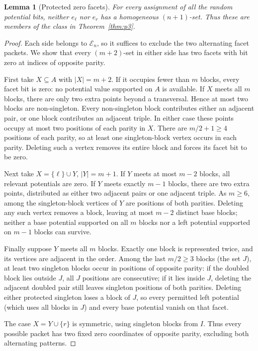 \documentclass[11pt,a4paper]{article}
\newtheorem{lemma}[theorem]{Lemma}
\theoremstyle{remark}
\newcommand{\E}{\mathcal E}
\begin{document}
\begin{lemma}[Protected zero facets]\label{lem:p3-admissible}
For \emph{every} assignment of all the random potential bits, neither
$e_\ell$ nor $e_r$ has a homogeneous $(n+1)$-set.
Thus these are members of the class in Theorem~\ref{thm:p3}.
\end{lemma}
\begin{proof}
Each side belongs to $\E_n$, so it suffices to exclude the two
alternating facet packets. We show that every $(m+2)$-set in either
side has two facets with bit zero at indices of opposite parity.

First take $X\subseteq A$ with $|X|=m+2$. If it occupies fewer than
$m$ blocks, every facet bit is zero: no potential value supported on
$A$ is available. If $X$ meets all $m$ blocks, there are only two
extra points beyond a transversal. Hence at most two blocks are
non-singleton. Every non-singleton block contributes either an
adjacent pair, or one block contributes an adjacent triple. In either
case these points occupy at most two positions of each parity in
$X$. There are $m/2+1\ge4$ positions of each parity, so at least
one singleton-block vertex occurs in each parity. Deleting such a
vertex removes its entire block and forces its facet bit to be zero.

Next take $X=\{\ell\}\cup Y$, $|Y|=m+1$. If $Y$ meets at most
$m-2$ blocks, all relevant potentials are zero. If $Y$ meets exactly
$m-1$ blocks, there are two extra points, distributed as either two
adjacent pairs or one adjacent triple. As $m\ge6$, among the
singleton-block vertices of $Y$ are positions of both parities.
Deleting any such vertex removes a block, leaving at most $m-2$
distinct base blocks; neither a base potential supported on all $m$
blocks nor a left potential supported on $m-1$ blocks can survive.

Finally suppose $Y$ meets all $m$ blocks. Exactly one block is
represented twice, and its vertices are adjacent in the order.
Among the last $m/2\ge3$ blocks (the set $J$), at least two
singleton blocks occur in positions of opposite parity: if the
doubled block lies outside $J$, all $J$ positions are consecutive;
if it lies inside $J$, deleting the adjacent doubled pair still leaves
singleton positions of both parities. Deleting either protected
singleton loses a block of $J$, so every permitted left potential
(which uses all blocks in $J$) and every base potential vanish on
that facet.

The case $X=Y\cup\{r\}$ is symmetric, using singleton blocks from
$I$. Thus every possible packet has two fixed zero coordinates of
opposite parity, excluding both alternating patterns.
\end{proof}
\end{document}
